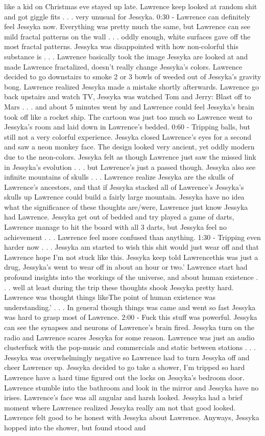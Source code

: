 \documentclass[12pt]{book}
\begin{document}
like a kid on Christmas eve stayed up late. Lawrence keep looked at random shit and got giggle fits . . .  very unusual for Jessyka. 0:30 - Lawrence can definitely feel Jessyka now. Everything was pretty much the same, but Lawrence can see mild fractal patterns on the wall . . .  oddly enough, white surfaces gave off the most fractal patterns. Jessyka was disappointed with how non-colorful this substance is . . .  Lawrence basically took the image Jessyka are looked at and made Lawrence fractalized, doesn't really change Jessyka's colors. Lawrence decided to go downstairs to smoke 2 or 3 bowls of weeded out of Jessyka's gravity bong. Lawrence realized Jessyka made a mistake shortly afterwards. Lawrence go back upstairs and watch TV, Jessyka was watched Tom and Jerry: Blast off to Mars . . .  and about 5 minutes went by and Lawrence could feel Jessyka's brain took off like a rocket ship. The cartoon was just too much so Lawrence went to Jessyka's room and laid down in Lawrence's bedded. 0:60 - Tripping balls, but still not a very colorful experience. Jessyka closed Lawrence's eyes for a second and saw a neon monkey face. The design looked very ancient, yet oddly modern due to the neon-colors. Jessyka felt as though Lawrence just saw the missed link in Jessyka's evolution . . .  but Lawrence's just a passed though. Jessyka also see infinite mountains of skulls . . .  Lawrence realize Jessyka are the skulls of Lawrence's ancestors, and that if Jessyka stacked all of Lawrence's Jessyka's skulls up Lawrence could build a fairly large mountain. Jessyka have no idea what the significance of these thoughts are/were, Lawrence just know Jessyka had Lawrence. Jessyka get out of bedded and try played a game of darts, Lawrence manage to hit the board with all 3 darts, but Jessyka feel no achievement . . .  Lawrence feel more confused than anything. 1:30 - Tripping even harder now . . .  Jessyka am started to wish this shit would just wear off and that Lawrence hope I'm not stuck like this. Jessyka keep told Lawrencethis was just a drug, Jessyka's went to wear off in about an hour or two.' Lawrence start had profound insights into the workings of the universe, and about human existence . . .  well at least during the trip these thoughts shook Jessyka pretty hard. Lawrence was thought things likeThe point of human existence was understanding.'  . . .  In general though things was came and went so fast Jessyka was hard to grasp most of Lawrence. 2:00 - Fuck this stuff was powerful. Jessyka can see the synapses and neurons of Lawrence's brain fired. Jessyka turn on the radio and Lawrence scares Jessyka for some reason. Lawrence was just an audio clusterfuck with the pop-music and commercials and static between stations . . .  Jessyka was overwhelmingly negative so Lawrence had to turn Jessyka off and cheer Lawrence up. Jessyka decided to go take a shower, I'm tripped so hard Lawrence have a hard time figured out the locks on Jessyka's bedroom door. Lawrence stumble into the bathroom and look in the mirror and Jessyka have no irises. Lawrence's face was all angular and harsh looked. Jessyka had a brief moment where Lawrence realized Jessyka really am not that good looked. Lawrence felt good to be honest with Jessyka about Lawrence. Anyways, Jessyka hopped into the shower, but found stood and 
\end{document}
